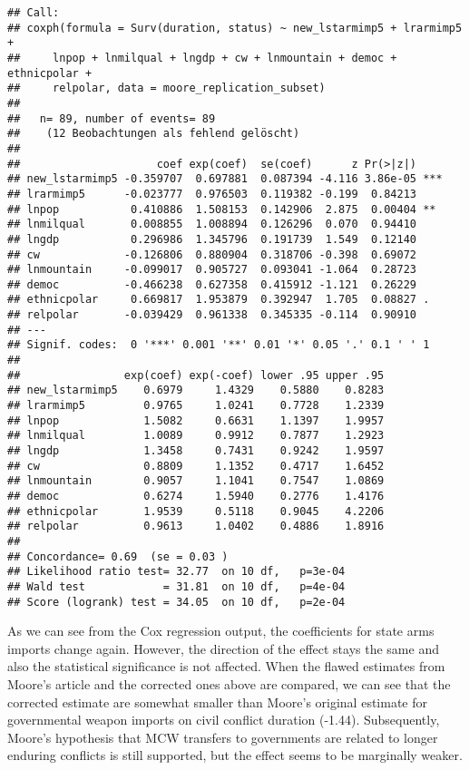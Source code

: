 \documentclass[
]{article}
\begin{document}
\begin{verbatim}
## Call:
## coxph(formula = Surv(duration, status) ~ new_lstarmimp5 + lrarmimp5 + 
##     lnpop + lnmilqual + lngdp + cw + lnmountain + democ + ethnicpolar + 
##     relpolar, data = moore_replication_subset)
## 
##   n= 89, number of events= 89 
##    (12 Beobachtungen als fehlend gelöscht)
## 
##                     coef exp(coef)  se(coef)      z Pr(>|z|)    
## new_lstarmimp5 -0.359707  0.697881  0.087394 -4.116 3.86e-05 ***
## lrarmimp5      -0.023777  0.976503  0.119382 -0.199  0.84213    
## lnpop           0.410886  1.508153  0.142906  2.875  0.00404 ** 
## lnmilqual       0.008855  1.008894  0.126296  0.070  0.94410    
## lngdp           0.296986  1.345796  0.191739  1.549  0.12140    
## cw             -0.126806  0.880904  0.318706 -0.398  0.69072    
## lnmountain     -0.099017  0.905727  0.093041 -1.064  0.28723    
## democ          -0.466238  0.627358  0.415912 -1.121  0.26229    
## ethnicpolar     0.669817  1.953879  0.392947  1.705  0.08827 .  
## relpolar       -0.039429  0.961338  0.345335 -0.114  0.90910    
## ---
## Signif. codes:  0 '***' 0.001 '**' 0.01 '*' 0.05 '.' 0.1 ' ' 1
## 
##                exp(coef) exp(-coef) lower .95 upper .95
## new_lstarmimp5    0.6979     1.4329    0.5880    0.8283
## lrarmimp5         0.9765     1.0241    0.7728    1.2339
## lnpop             1.5082     0.6631    1.1397    1.9957
## lnmilqual         1.0089     0.9912    0.7877    1.2923
## lngdp             1.3458     0.7431    0.9242    1.9597
## cw                0.8809     1.1352    0.4717    1.6452
## lnmountain        0.9057     1.1041    0.7547    1.0869
## democ             0.6274     1.5940    0.2776    1.4176
## ethnicpolar       1.9539     0.5118    0.9045    4.2206
## relpolar          0.9613     1.0402    0.4886    1.8916
## 
## Concordance= 0.69  (se = 0.03 )
## Likelihood ratio test= 32.77  on 10 df,   p=3e-04
## Wald test            = 31.81  on 10 df,   p=4e-04
## Score (logrank) test = 34.05  on 10 df,   p=2e-04
\end{verbatim}

As we can see from the Cox regression output, the coefficients for state
arms imports change again. However, the direction of the effect stays
the same and also the statistical significance is not affected. When the
flawed estimates from Moore's article and the corrected ones above are
compared, we can see that the corrected estimate are somewhat smaller
than Moore's original estimate for governmental weapon imports on civil
conflict duration (-1.44). Subsequently, Moore's hypothesis that MCW
transfers to governments are related to longer enduring conflicts is
still supported, but the effect seems to be marginally weaker.
\end{document}
